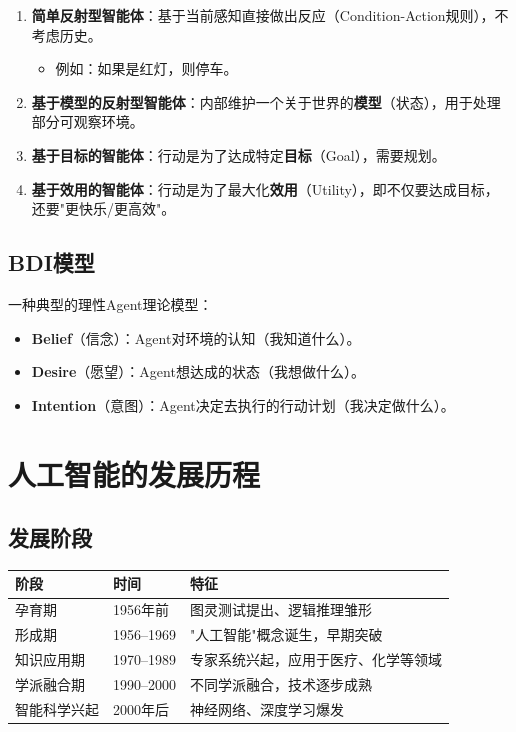 \begin{enumerate}[leftmargin=2em,itemsep=0pt]
    \item \textbf{简单反射型智能体}：基于当前感知直接做出反应（Condition-Action规则），不考虑历史。
    \begin{itemize}
        \item 例如：如果是红灯，则停车。
    \end{itemize}
    \item \textbf{基于模型的反射型智能体}：内部维护一个关于世界的\textbf{模型}（状态），用于处理部分可观察环境。
    \item \textbf{基于目标的智能体}：行动是为了达成特定\textbf{目标}（Goal），需要规划。
    \item \textbf{基于效用的智能体}：行动是为了最大化\textbf{效用}（Utility），即不仅要达成目标，还要"更快乐/更高效"。
\end{enumerate}

\subsection{BDI模型}
一种典型的理性Agent理论模型：
\begin{itemize}[leftmargin=2em,itemsep=0pt]
    \item \textbf{Belief}（信念）：Agent对环境的认知（我知道什么）。
    \item \textbf{Desire}（愿望）：Agent想达成的状态（我想做什么）。
    \item \textbf{Intention}（意图）：Agent决定去执行的行动计划（我决定做什么）。
\end{itemize}

\section{人工智能的发展历程}

\subsection{发展阶段}
\begin{table}[htbp]
\centering\small
\begin{tabular}{lll}
\toprule
\textbf{阶段} & \textbf{时间} & \textbf{特征} \\
\midrule
孕育期 & 1956年前 & 图灵测试提出、逻辑推理雏形 \\
形成期 & 1956--1969 & "人工智能"概念诞生，早期突破 \\
知识应用期 & 1970--1989 & 专家系统兴起，应用于医疗、化学等领域 \\
学派融合期 & 1990--2000 & 不同学派融合，技术逐步成熟 \\
智能科学兴起 & 2000年后 & 神经网络、深度学习爆发 \\
\bottomrule
\end{tabular}
\end{table}

